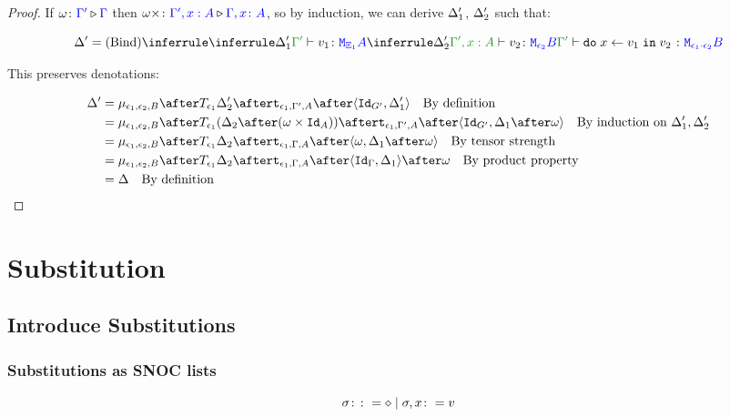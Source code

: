 \documentclass{report}
\begin{document}
\begin{framed}
\begin{proof}
        If $\omega \colon {\color{blue}\Gamma'} \triangleright {\color {blue} \Gamma}$ then $\omega\times \colon {\color{blue}\Gamma',x:A} \triangleright {\color {blue} \Gamma, x\colon A}$, so by induction, we can derive $\Delta_1'$, $\Delta_2'$ such that:
        
        \begin{equation}
            \D' = \ntreeruleII{Bind}{
                \treeruleI{\D_1'}{\typerelation{\G'}{v_1}{\M{\E_1}{A}}}
                }{
                \treeruleI{\D_2'}{\typerelation{\G',x: A}{v_2}{\M{\e_2}{B}}}
            }{
                \typerelation{\G'}{\doin{x}{v_1}{v_2}}{\M{\e_1\dot\e_2}{B}}
            }
        \end{equation}
        
        This preserves denotations:
        
        \begin{align*}
            \D' & = \bind{\e_1}{\e_2}{B}\after\T{\e_1}{\D_2'}\after\tstrength{\e_1}{\G'}{A}\after\pr{\Id{G'}}{\D_1'}\qt{By definition}\\
            & = \bind{\e_1}{\e_2}{B}\after\T{\e_1}{(\D_2\after(\w\times\Id{A}))}\after\tstrength{\e_1}{\G'}{A}\after\pr{\Id{G'}}{\D_1\after\w}\qt{By induction on $\D_1', \D_2'$}\\
            & = \bind{\e_1}{\e_2}{B}\after\T{\e_1}{\D_2}\after\tstrength{\e_1}{\G}{A}\after\pr{\w}{\D_1\after\w}\qt{By tensor strength}\\
            & = \bind{\e_1}{\e_2}{B}\after\T{\e_1}{\D_2}\after\tstrength{\e_1}{\G}{A}\after\pr{\idg}{\D_1}\after\w\qt{By product property}\\
            & = \D \qt{By definition}
        \end{align*}
        
    \end{proof}
\end{framed}


\chapter{Substitution}
\section{Introduce Substitutions}
\subsection{Substitutions as SNOC lists}

\begin{equation}
   \sigma \colon\colon= \diamond \mid \sigma, x \colon= v
\end{equation}
\end{document}
